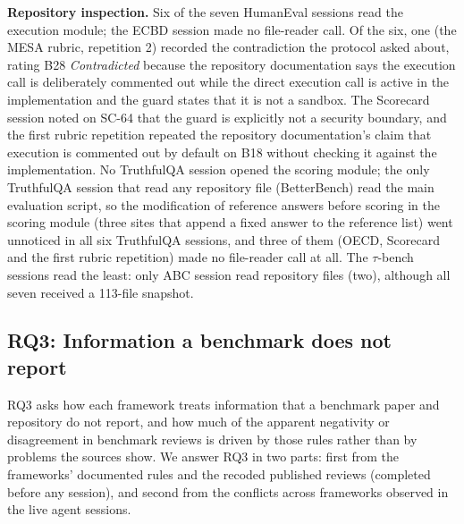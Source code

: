 \documentclass[10pt,conference]{IEEEtran}
\begin{document}
\textbf{Repository inspection.} Six of the seven HumanEval sessions read the execution module; the ECBD session made no file-reader call. Of the six, one (the MESA rubric, repetition 2) recorded the contradiction the protocol asked about, rating B28 \emph{Contradicted} because the repository documentation says the execution call is deliberately commented out while the direct execution call is active in the implementation and the guard states that it is not a sandbox. The Scorecard session noted on SC-64 that the guard is explicitly not a security boundary, and the first rubric repetition repeated the repository documentation's claim that execution is commented out by default on B18 without checking it against the implementation. No TruthfulQA session opened the scoring module; the only TruthfulQA session that read any repository file (BetterBench) read the main evaluation script, so the modification of reference answers before scoring in the scoring module (three sites that append a fixed answer to the reference list) went unnoticed in all six TruthfulQA sessions, and three of them (OECD, Scorecard and the first rubric repetition) made no file-reader call at all. The $\tau$-bench sessions read the least: only ABC session read repository files (two), although all seven received a 113-file snapshot.

\subsection{RQ3: Information a benchmark does not report}
\label{sec:rq3}
RQ3 asks how each framework treats information that a benchmark paper and repository do not report, and how much of the apparent negativity or disagreement in benchmark reviews is driven by those rules rather than by problems the sources show. We answer RQ3 in two parts: first from the frameworks' documented rules and the recoded published reviews (completed before any session), and second from the conflicts across frameworks observed in the live agent sessions.
\end{document}
